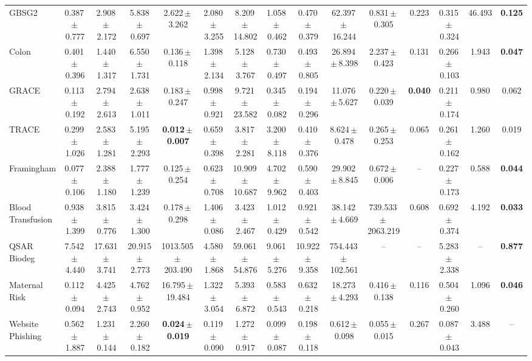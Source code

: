 \documentclass[8pt]{extarticle}
\begin{document}
\begin{longtable}{l*{14}{c}}
GBSG2 & 0.387\,$\pm$\,0.777 & 2.908\,$\pm$\,2.172 & 5.838\,$\pm$\,0.697 & 2.622\,$\pm$\,3.262 & 2.080\,$\pm$\,3.255 & 8.209\,$\pm$\,14.802 & 1.058\,$\pm$\,0.462 & 0.470\,$\pm$\,0.379 & 62.397\,$\pm$\,16.244 & 0.831\,$\pm$\,0.305 & 0.223 & 0.315\,$\pm$\,0.324 & 46.493 & \textbf{0.125} \\
Colon & 0.401\,$\pm$\,0.396 & 1.440\,$\pm$\,1.317 & 6.550\,$\pm$\,1.731 & 0.136\,$\pm$\,0.118 & 1.398\,$\pm$\,2.134 & 5.128\,$\pm$\,3.767 & 0.730\,$\pm$\,0.497 & 0.493\,$\pm$\,0.805 & 26.894\,$\pm$\,8.398 & 2.237\,$\pm$\,0.423 & 0.131 & 0.266\,$\pm$\,0.103 & 1.943 & \textbf{0.047} \\
GRACE & 0.113\,$\pm$\,0.192 & 2.794\,$\pm$\,2.613 & 2.638\,$\pm$\,1.011 & 0.183\,$\pm$\,0.247 & 0.998\,$\pm$\,0.921 & 9.721\,$\pm$\,23.582 & 0.345\,$\pm$\,0.082 & 0.194\,$\pm$\,0.296 & 11.076\,$\pm$\,5.627 & 0.220\,$\pm$\,0.039 & \textbf{0.040} & 0.211\,$\pm$\,0.174 & 0.980 & 0.062 \\
TRACE & 0.299\,$\pm$\,1.026 & 2.583\,$\pm$\,1.281 & 5.195\,$\pm$\,2.293 & \textbf{0.012\,$\pm$\,0.007} & 0.659\,$\pm$\,0.398 & 3.817\,$\pm$\,2.281 & 3.200\,$\pm$\,8.118 & 0.410\,$\pm$\,0.376 & 8.624\,$\pm$\,0.478 & 0.265\,$\pm$\,0.253 & 0.065 & 0.261\,$\pm$\,0.162 & 1.260 & 0.019 \\
Framingham & 0.077\,$\pm$\,0.106 & 2.388\,$\pm$\,1.180 & 1.777\,$\pm$\,1.239 & 0.125\,$\pm$\,0.254 & 0.623\,$\pm$\,0.708 & 10.909\,$\pm$\,10.687 & 4.702\,$\pm$\,9.962 & 0.590\,$\pm$\,0.403 & 29.902\,$\pm$\,8.845 & 0.672\,$\pm$\,0.006 & -- & 0.227\,$\pm$\,0.173 & 0.588 & \textbf{0.044} \\
Blood Transfusion & 0.938\,$\pm$\,1.399 & 3.815\,$\pm$\,0.776 & 3.424\,$\pm$\,1.300 & 0.178\,$\pm$\,0.298 & 1.406\,$\pm$\,0.086 & 3.423\,$\pm$\,2.467 & 1.012\,$\pm$\,0.429 & 0.921\,$\pm$\,0.542 & 38.142\,$\pm$\,4.669 & 739.533\,$\pm$\,2063.219 & 0.608 & 0.692\,$\pm$\,0.374 & 4.192 & \textbf{0.033} \\
QSAR Biodeg & 7.542\,$\pm$\,4.440 & 17.631\,$\pm$\,3.741 & 20.915\,$\pm$\,2.773 & 1013.505\,$\pm$\,203.490 & 4.580\,$\pm$\,1.868 & 59.061\,$\pm$\,54.876 & 9.061\,$\pm$\,5.276 & 10.922\,$\pm$\,9.358 & 754.443\,$\pm$\,102.561 & -- & -- & 5.283\,$\pm$\,2.338 & -- & \textbf{0.877} \\
Maternal Risk & 0.112\,$\pm$\,0.094 & 4.425\,$\pm$\,2.743 & 4.762\,$\pm$\,0.952 & 16.795\,$\pm$\,19.484 & 1.322\,$\pm$\,3.054 & 5.393\,$\pm$\,6.872 & 0.583\,$\pm$\,0.543 & 0.632\,$\pm$\,0.218 & 18.273\,$\pm$\,4.293 & 0.416\,$\pm$\,0.138 & 0.116 & 0.504\,$\pm$\,0.260 & 1.096 & \textbf{0.046} \\
Website Phishing & 0.562\,$\pm$\,1.887 & 1.231\,$\pm$\,0.144 & 2.260\,$\pm$\,0.182 & \textbf{0.024\,$\pm$\,0.019} & 0.119\,$\pm$\,0.090 & 1.272\,$\pm$\,0.917 & 0.099\,$\pm$\,0.087 & 0.198\,$\pm$\,0.118 & 0.612\,$\pm$\,0.098 & 0.055\,$\pm$\,0.015 & 0.267 & 0.087\,$\pm$\,0.043 & 3.488 & -- \\
\end{longtable}
\end{document}
